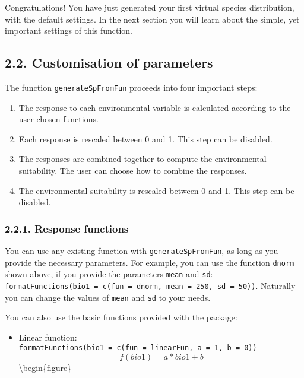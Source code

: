 \documentclass[]{article}
\providecommand{\tightlist}{%
  \setlength{\itemsep}{0pt}\setlength{\parskip}{0pt}}
\begin{document}
Congratulations! You have just generated your first virtual species
distribution, with the default settings. In the next section you will
learn about the simple, yet important settings of this function.

\subsection{2.2. Customisation of
parameters}\label{customisation-of-parameters}

The function \texttt{generateSpFromFun} proceeds into four important
steps:

\begin{enumerate}
\def\labelenumi{\arabic{enumi}.}
\tightlist
\item
  The response to each environmental variable is calculated according to
  the user-chosen functions.
\item
  Each response is rescaled between 0 and 1. This step can be disabled.
\item
  The responses are combined together to compute the environmental
  suitability. The user can choose how to combine the responses.
\item
  The environmental suitability is rescaled between 0 and 1. This step
  can be disabled.
\end{enumerate}

\subsubsection{2.2.1. Response functions}\label{response-functions}

You can use any existing function with \texttt{generateSpFromFun}, as
long as you provide the necessary parameters. For example, you can use
the function \texttt{dnorm} shown above, if you provide the parameters
\texttt{mean} and \texttt{sd}:
\texttt{formatFunctions(bio1\ =\ c(fun\ =\ \textquotesingle{}dnorm\textquotesingle{},\ mean\ =\ 250,\ sd\ =\ 50))}.
Naturally you can change the values of \texttt{mean} and \texttt{sd} to
your needs.

You can also use the basic functions provided with the package:

\begin{itemize}
\tightlist
\item
  Linear function:
  \texttt{formatFunctions(bio1\ =\ c(fun\ =\ \textquotesingle{}linearFun\textquotesingle{},\ a\ =\ 1,\ b\ =\ 0))}
  \[ f(bio1) = a * bio1 + b \] \textbackslash{}begin\{figure\}
\end{itemize}
\end{document}
